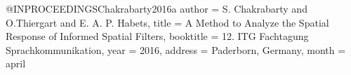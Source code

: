 @INPROCEEDINGS{Chakrabarty2016a
    author = {S. Chakrabarty and O.Thiergart and E. A. P. Habets},
    title = {A Method to Analyze the Spatial Response of Informed Spatial Filters},
    booktitle = 12. ITG Fachtagung Sprachkommunikation,
    year = {2016},
    address = {Paderborn, Germany},
    month = april
}